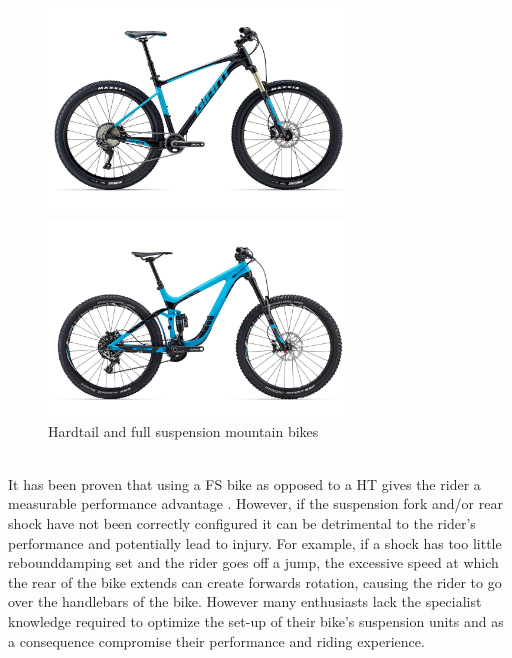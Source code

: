 	\begin{figure}[h!]
		\centering
		\begin{minipage}{0.45\textwidth}
			\centering
			\includegraphics[width=8cm]{../images/2017_GIANT_FATHOM_1.jpg}
		\end{minipage}\hfill
		\begin{minipage}{0.45\textwidth}
			\centering
			\includegraphics[width=8cm]{../images/2016_Giant_Reign_Advanced_275_0.jpg}
		\end{minipage}
		\caption{Hardtail and full suspension mountain bikes \citep{giantfathom,giantreign}}
		\label{fig:fsandht}
	\end{figure}
	\\
	It has been proven that using a FS bike as opposed to a HT gives the rider a measurable performance advantage \citep{fullsusperf}. However, if the suspension fork and/or rear shock have not been correctly configured it can be detrimental to the rider’s performance and potentially lead to injury. For example, if a \gls{shock} has too little \gls{rebounddamping} set and the rider goes off a jump, the excessive speed at which the	rear of the bike extends can create forwards rotation, causing the rider to go over the handlebars of the bike. However many enthusiasts lack the specialist knowledge required to optimize the set-up of their bike’s suspension units and as a consequence compromise their performance and riding experience.
	\\\\
